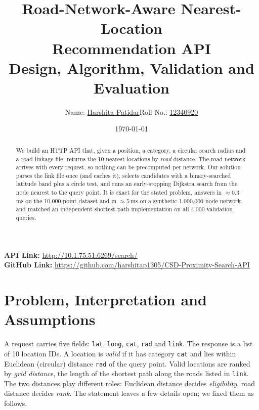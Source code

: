 \documentclass[11pt,a4paper]{article}
\title{\vspace{-1.2cm}\textbf{Road-Network-Aware Nearest-Location\\Recommendation API}\\[2pt]
\large Design, Algorithm, Validation and Evaluation}
\author{Name: \underline{Harshita Patidar}\quad Roll No.: \underline{12340920}}
\date{\today}
\newcommand{\code}[1]{\texttt{#1}}
\begin{document}
\maketitle
\vspace{-1.0cm}
\begin{center}
\textbf{API Link:} \url{http://10.1.75.51:6269/search/}\\
\textbf{GitHub Link:} \url{https://github.com/harshitap1305/CSD-Proximity-Search-API}
\end{center}
\vspace{0.2cm}

\begin{abstract}\noindent
We build an HTTP API that, given a position, a category, a circular search radius and a road-linkage file,
returns the 10 nearest locations by \emph{road} distance. The road network arrives with every request, so
nothing can be precomputed per network. Our solution parses the link file once (and caches it), selects
candidates with a binary-searched latitude band plus a circle test, and runs an early-stopping Dijkstra search
from the node nearest to the query point. It is exact for the stated problem, answers in $\approx$0.3\,ms on the
10{,}000-point dataset and in $\approx$5\,ms on a synthetic 1{,}000{,}000-node network, and matched an
independent shortest-path implementation on all 4{,}000 validation queries.
\end{abstract}

\section{Problem, Interpretation and Assumptions}
A request carries five fields: \code{lat}, \code{long}, \code{cat}, \code{rad} and \code{link}. The response is a list of
10 location IDs. A location is \emph{valid} if it has category \code{cat} and lies within Euclidean (circular)
distance \code{rad} of the query point. Valid locations are ranked by \emph{grid distance}, the length of the shortest
path along the roads listed in \code{link}. The two distances play different roles: Euclidean distance decides
\emph{eligibility}, road distance decides \emph{rank}. The statement leaves a few details open; we fixed them as follows.
\end{document}
